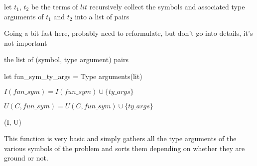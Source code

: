 \documentclass[]{ceurart}
\begin{document}
\begin{algorithm}[th]
\begin{algorithmic}[1]

   \State let \(t_1\), \(t_2\) be the terms of \(lit\)
   \State recursively collect the symbols and associated type arguments of \(t_1\) and \(t_2\) into a list of pairs

   \State \Comment Going a bit fast here, probably need to reformulate, but don't go into details, it's not important

   \State \Return the list of (symbol, type argument) pairs

\EndFunction
\end{algorithmic}
\end{algorithm}


\begin{algorithm}[tbh]
\begin{algorithmic}[1]
         \State let fun\_sym\_ty\_args = Type arguments(lit)

            \State \(I(fun\_sym) = I(fun\_sym) \cup \{ty\_args\}\)

         \Else

            \State \(U(C, fun\_sym) = U(C, fun\_sym) \cup \{ty\_args\}\)

         \EndIf
         \EndFor
      \EndFor
   \EndFor

   \State \Return (I, U)

\EndFunction
\end{algorithmic}
\end{algorithm}

This function is very basic and simply gathers all the type arguments of the various symbols of the problem and sorts them depending on whether they are ground or not.
\end{document}
